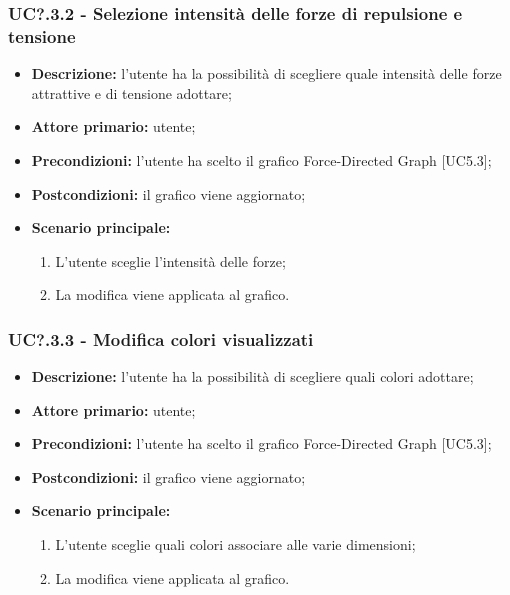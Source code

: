   \subsubsection{UC?.3.2 - Selezione intensità delle forze di repulsione e tensione}
  \begin{itemize}
    \item \textbf{Descrizione:} l'utente ha la possibilità di scegliere quale intensità delle forze attrattive e di tensione adottare;
    \item \textbf{Attore primario:} utente;
    \item \textbf{Precondizioni:} l’utente ha scelto il grafico Force-Directed Graph [UC5.3];
    \item \textbf{Postcondizioni:} il grafico viene aggiornato;
    \item \textbf{Scenario principale:}
      \begin{enumerate}
      \item L'utente sceglie l'intensità delle forze;
      \item La modifica viene applicata al grafico.
    \end{enumerate}
  \end{itemize}

  \subsubsection{UC?.3.3 - Modifica colori visualizzati}
  \begin{itemize}
    \item \textbf{Descrizione:} l'utente ha la possibilità di scegliere quali colori adottare;
    \item \textbf{Attore primario:} utente;
    \item \textbf{Precondizioni:} l’utente ha scelto il grafico Force-Directed Graph [UC5.3];
    \item \textbf{Postcondizioni:} il grafico viene aggiornato;
    \item \textbf{Scenario principale:}
     \begin{enumerate}
      \item L'utente sceglie quali colori associare alle varie dimensioni;
      \item La modifica viene applicata al grafico.
    \end{enumerate}
  \end{itemize}


